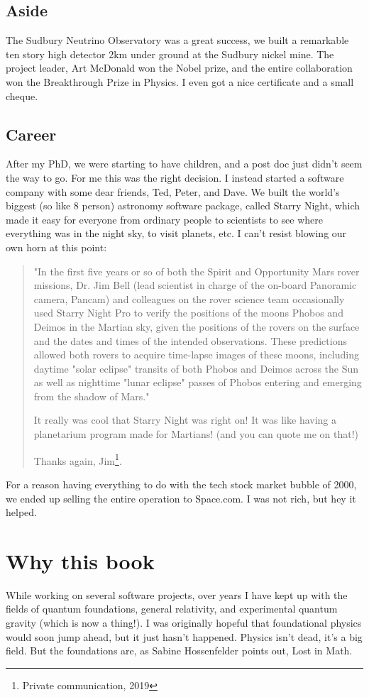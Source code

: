 \documentclass[../rzero]{subfiles}
\begin{document}
\subsection*{Aside}
The Sudbury Neutrino Observatory was a great success, we built a remarkable ten story high detector 2km under ground at the Sudbury nickel mine. The project leader, Art McDonald won the Nobel prize, and the entire collaboration won the Breakthrough Prize in Physics. I even got a nice certificate and a small cheque.

\subsection*{Career}
After my PhD, we were starting to have children, and a post doc just didn't seem the way to go. For me this was the right decision. I instead started a software company with some dear friends, Ted, Peter, and Dave. We built the world's biggest (so like 8 person) astronomy software package, called Starry Night, which made it easy for everyone from ordinary people to scientists to see where everything was in the night sky, to visit planets, etc. I can't resist blowing our own horn at this point:
\begin{quotation}
	"In the first five years or so of both the Spirit and Opportunity Mars rover missions, Dr. Jim Bell (lead scientist in charge of the on-board Panoramic camera, Pancam) and colleagues on the rover science team occasionally used Starry Night Pro to verify the positions of the moons Phobos and Deimos in the Martian sky, given the positions of the rovers on the surface and the dates and times of the intended observations. These predictions allowed both rovers to acquire time-lapse images of these moons, including daytime "solar eclipse" transits of both Phobos and Deimos across the Sun as well as nighttime "lunar eclipse" passes of Phobos entering and emerging from the shadow of Mars."
 
It really was cool that Starry Night was right on!  It was like having a planetarium program made for Martians!   (and you can quote me on that!)
 
Thanks again,
Jim\footnote{Private communication, 2019}.
\end{quotation} 

For a reason having everything to do with the tech stock market bubble of 2000, we ended up selling the entire operation to Space.com. I was not rich, but hey it helped. 


\section*{Why this book}
While working on several software projects, over years I have kept up with the fields of quantum foundations, general relativity, and experimental quantum gravity (which is now a thing!)\cite{Marletto2017}. I was originally hopeful that foundational physics would soon jump ahead, but it just hasn't happened. Physics isn't dead, it's a big field. But the foundations are, as Sabine Hossenfelder points out, Lost in Math\cite{hossenfelder2018lost}.
\end{document}
